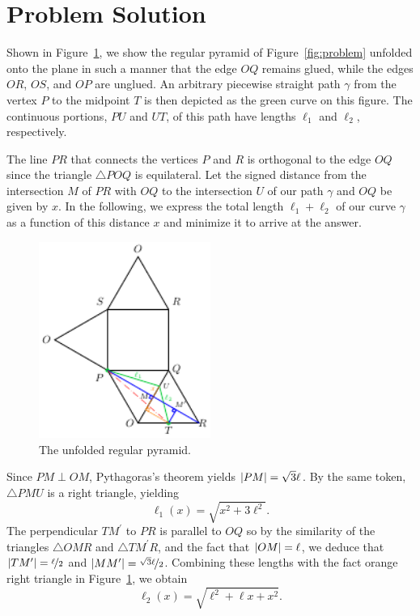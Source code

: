 \section{Problem Solution}
\label{sec:solution}

Shown in Figure~\ref{fig:unfolded}, we show the regular pyramid of
Figure~\ref{fig:problem} unfolded onto the plane in such a manner that the edge
$OQ$ remains glued, while the edges $OR$, $OS$, and $OP$ are unglued. An
arbitrary piecewise straight path $\gamma$ from the vertex $P$ to the midpoint
$T$ is then depicted as the green curve on this figure. The continuous portions,
$PU$ and $UT$, of this path have lengths $\ell_1$ and $\ell_2$, respectively.

The line $PR$ that connects the vertices $P$ and $R$ is orthogonal to the edge
$OQ$ since the triangle $\triangle POQ$ is equilateral. Let the signed distance
from the intersection $M$ of $PR$ with $OQ$ to the intersection $U$ of our path
$\gamma$ and $OQ$ be given by $x$. In the following, we express the total length
$\ell_1 + \ell_2$ of our curve $\gamma$ as a function of this distance $x$ and
minimize it to arrive at the answer.

\begin{figure}[h]
  \centering
  \includegraphics[trim={0 0 0
  0cm},clip,width=0.5\textwidth]{./figures/pyramid-unfolded.pdf}
  \vspace{-8mm}
  \caption{The unfolded regular pyramid.}
  \label{fig:unfolded}
\end{figure}

Since $PM \perp OM$, Pythagoras's theorem yields $\left|{PM}\right| = \sqrt{3}\ell$. By
the same token, $\triangle PMU$ is a right triangle, yielding 
%
\begin{equation}
    \ell_1(x) = \sqrt{x^2 + 3\ell^2}. 
    \label{eq:ell1}
\end{equation}    
%
The perpendicular $TM^\prime$ to $PR$ is parallel to $OQ$ so by the similarity
of the triangles $\triangle OMR$ and $\triangle TM^\prime R$, and the fact that
$\left|{OM}\right| = \ell$, we deduce that $\left|{TM^\prime}\right| = \nicefrac{\ell}{2}$ and
$\left|{MM^\prime}\right| = \nicefrac{\sqrt{3}\ell}{2}$. Combining these lengths with the
fact orange right triangle in Figure~\ref{fig:unfolded}, we obtain 
%
\begin{equation}
  \ell_2(x) = \sqrt{\ell^2 + \ell x + x^2}.
  \label{eq:ell2}
\end{equation}

